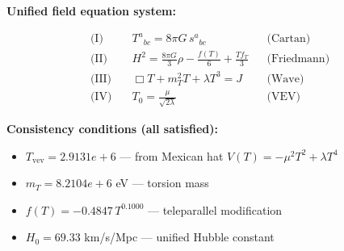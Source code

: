 
\textbf{Unified field equation system:}

\begin{align}
  \text{(I)} \quad & T^a{}_{bc} = 8\pi G \, s^a{}_{bc} && \text{(Cartan)} \\
  \text{(II)} \quad & H^2 = \frac{8\pi G}{3}\rho - \frac{f(T)}{6} + \frac{Tf_T}{3} && \text{(Friedmann)} \\
  \text{(III)} \quad & \Box T + m_T^2 T + \lambda T^3 = J && \text{(Wave)} \\
  \text{(IV)} \quad & T_0 = \frac{\mu}{\sqrt{2\lambda}} && \text{(VEV)}
\end{align}

\textbf{Consistency conditions (all satisfied):}
\begin{itemize}
  \item $T_{\text{vev}} = 2.9131e+6$ — from Mexican hat $V(T) = -\mu^2 T^2 + \lambda T^4$
  \item $m_T = 8.2104e+6$ eV — torsion mass
  \item $f(T) = -0.4847 \, T^{0.1000}$ — teleparallel modification
  \item $H_0 = 69.33$ km/s/Mpc — unified Hubble constant
\end{itemize}